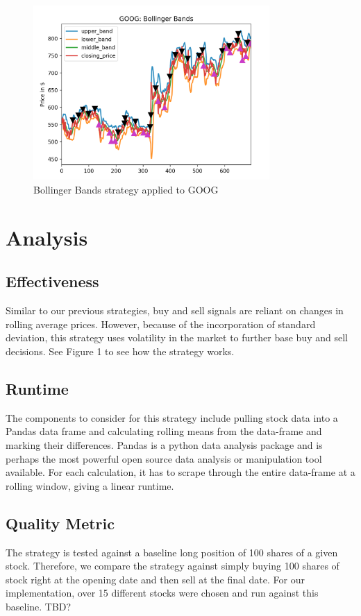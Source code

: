 \documentclass[letterpaper,11pt]{article}
\begin{document}
\begin{figure}[ht!]
\centering
\includegraphics[width=90mm]{Goog_Bbands.png}
\caption{Bollinger Bands strategy applied to GOOG  \label{overflow}}
\end{figure}

\section*{Analysis}

\subsection*{Effectiveness}
Similar to our previous strategies, buy and sell signals are reliant on changes in rolling average prices. However, because of the incorporation of standard deviation, this strategy uses volatility in the market to further base buy and sell decisions. See Figure 1 to see how the strategy works.

\subsection*{Runtime}
The components to consider for this strategy include pulling stock data into a Pandas data frame and calculating rolling means from the data-frame and marking their differences. Pandas is a python data analysis package and is perhaps the most powerful open source data analysis or manipulation tool available. For each calculation, it has to scrape through the entire data-frame at a rolling window, giving a linear runtime.

\subsection*{Quality Metric}
The strategy is tested against a baseline long position of 100 shares of a given stock. Therefore, we compare the strategy against simply buying 100 shares of stock right at the opening date and then sell at the final date. For our implementation, over 15 different stocks were chosen and run against this baseline. TBD?
\end{document}
